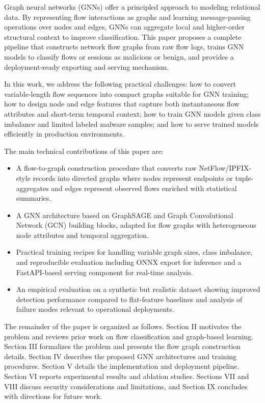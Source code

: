 \documentclass[conference]{IEEEtran}
\begin{document}
Graph neural networks (GNNs) offer a principled approach to modeling relational data. By representing flow interactions as graphs and learning message-passing operations over nodes and edges, GNNs can aggregate local and higher-order structural context to improve classification. This paper proposes a complete pipeline that constructs network flow graphs from raw flow logs, trains GNN models to classify flows or sessions as malicious or benign, and provides a deployment-ready exporting and serving mechanism.

In this work, we address the following practical challenges: how to convert variable-length flow sequences into compact graphs suitable for GNN training; how to design node and edge features that capture both instantaneous flow attributes and short-term temporal context; how to train GNN models given class imbalance and limited labeled malware samples; and how to serve trained models efficiently in production environments.

The main technical contributions of this paper are:

\begin{itemize}
  \item A flow-to-graph construction procedure that converts raw NetFlow/IPFIX-style records into directed graphs where nodes represent endpoints or tuple-aggregates and edges represent observed flows enriched with statistical summaries.
  \item A GNN architecture based on GraphSAGE and Graph Convolutional Network (GCN) building blocks, adapted for flow graphs with heterogeneous node attributes and temporal aggregation.
  \item Practical training recipes for handling variable graph sizes, class imbalance, and reproducible evaluation including ONNX export for inference and a FastAPI-based serving component for real-time analysis.
  \item An empirical evaluation on a synthetic but realistic dataset showing improved detection performance compared to flat-feature baselines and analysis of failure modes relevant to operational deployments.
\end{itemize}

The remainder of the paper is organized as follows. Section II motivates the problem and reviews prior work on flow classification and graph-based learning. Section III formalizes the problem and presents the flow graph construction details. Section IV describes the proposed GNN architectures and training procedures. Section V details the implementation and deployment pipeline. Section VI reports experimental results and ablation studies. Sections VII and VIII discuss security considerations and limitations, and Section IX concludes with directions for future work.
\end{document}
